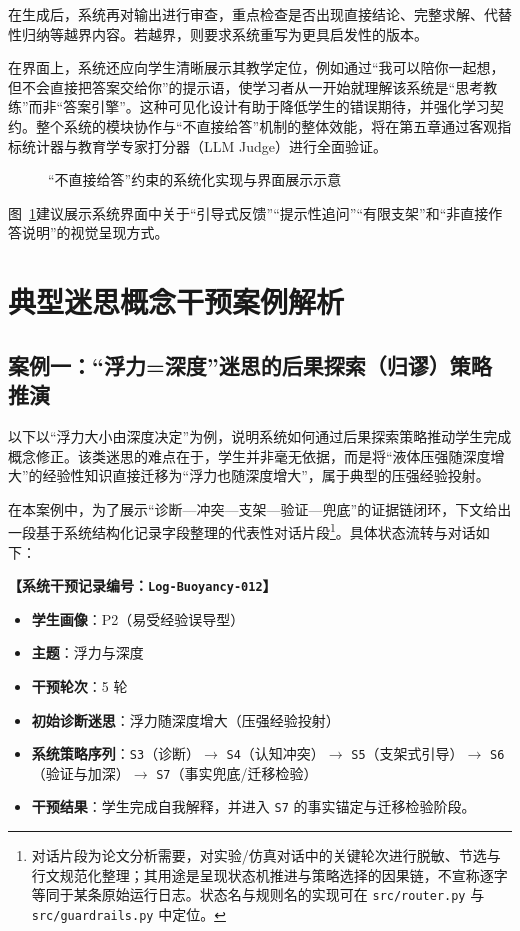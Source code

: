 在生成后，系统再对输出进行审查，重点检查是否出现直接结论、完整求解、代替性归纳等越界内容。若越界，则要求系统重写为更具启发性的版本。

在界面上，系统还应向学生清晰展示其教学定位，例如通过“我可以陪你一起想，但不会直接把答案交给你”的提示语，使学习者从一开始就理解该系统是“思考教练”而非“答案引擎”。这种可见化设计有助于降低学生的错误期待，并强化学习契约。整个系统的模块协作与“不直接给答”机制的整体效能，将在第五章通过客观指标统计器与教育学专家打分器（LLM Judge）进行全面验证。

\begin{figure}[htbp]
    \centering
    \caption{“不直接给答”约束的系统化实现与界面展示示意}
    \label{fig:no-direct-answer-ui}
\end{figure}

图~\ref{fig:no-direct-answer-ui}建议展示系统界面中关于“引导式反馈”“提示性追问”“有限支架”和“非直接作答说明”的视觉呈现方式。

\section{典型迷思概念干预案例解析}
\label{sec:4.6}

\subsection{案例一：“浮力=深度”迷思的后果探索（归谬）策略推演}
\label{sec:4.6.1}

以下以“浮力大小由深度决定”为例，说明系统如何通过后果探索策略推动学生完成概念修正。该类迷思的难点在于，学生并非毫无依据，而是将“液体压强随深度增大”的经验性知识直接迁移为“浮力也随深度增大”，属于典型的压强经验投射。

在本案例中，为了展示“诊断—冲突—支架—验证—兜底”的证据链闭环，下文给出一段基于系统结构化记录字段整理的代表性对话片段\footnote{对话片段为论文分析需要，对实验/仿真对话中的关键轮次进行脱敏、节选与行文规范化整理；其用途是呈现状态机推进与策略选择的因果链，不宣称逐字等同于某条原始运行日志。状态名与规则名的实现可在 \texttt{src/router.py} 与 \texttt{src/guardrails.py} 中定位。}。具体状态流转与对话如下：

\textbf{【系统干预记录编号：\texttt{Log-Buoyancy-012}】}
\begin{itemize}
    \item \textbf{学生画像}：P2（易受经验误导型）
    \item \textbf{主题}：浮力与深度
    \item \textbf{干预轮次}：5 轮
    \item \textbf{初始诊断迷思}：浮力随深度增大（压强经验投射）
    \item \textbf{系统策略序列}：\texttt{S3}（诊断）$\rightarrow$ \texttt{S4}（认知冲突）$\rightarrow$ \texttt{S5}（支架式引导）$\rightarrow$ \texttt{S6}（验证与加深）$\rightarrow$ \texttt{S7}（事实兜底/迁移检验）
    \item \textbf{干预结果}：学生完成自我解释，并进入 \texttt{S7} 的事实锚定与迁移检验阶段。
\end{itemize}

